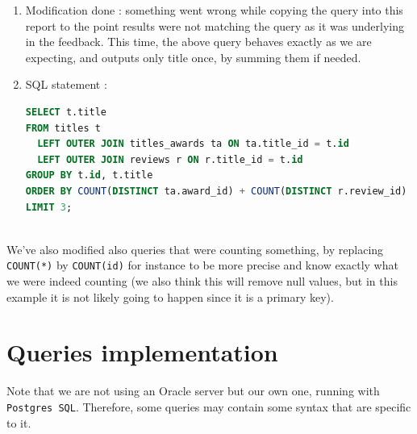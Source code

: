 \documentclass[doubleside, titlepage]{article}
\begin{document}
	\begin{enumerate}
	\item Modification done : something went wrong while copying the query into this report to the point results were not matching the query as it was underlying in the feedback. This time, the above query behaves exactly as we are expecting, and outputs only title once, by summing them if needed.
	\item SQL statement :
		\begin{lstlisting}[language=SQL,showspaces=false,basicstyle=\ttfamily,numberstyle=\tiny,commentstyle=\color{gray}]
SELECT t.title
FROM titles t
  LEFT OUTER JOIN titles_awards ta ON ta.title_id = t.id
  LEFT OUTER JOIN reviews r ON r.title_id = t.id
GROUP BY t.id, t.title
ORDER BY COUNT(DISTINCT ta.award_id) + COUNT(DISTINCT r.review_id) DESC
LIMIT 3;
		\end{lstlisting}

\end{enumerate}
~\\
We've also modified also queries that were counting something, by replacing \texttt{COUNT(*)} by \texttt{COUNT(id)} for instance to be more precise and know exactly what we were indeed counting (we also think this will remove null values, but in this example it is not likely going to happen since it is a primary key).

\section{Queries implementation}

Note that we are not using an Oracle server but our own one, running with \texttt{Postgres SQL}. Therefore, some queries may contain some syntax that are specific to it.
\end{document}
